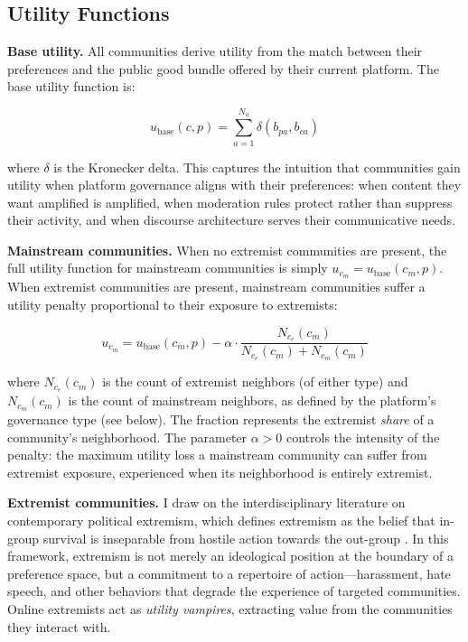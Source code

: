 \documentclass[12pt]{article}
\begin{document}
\subsection{Utility Functions}
\label{sec:utility}

\textbf{Base utility.} All communities derive utility from the match between their preferences and the public good bundle offered by their current platform. The base utility function is:

\begin{equation}
u_{\text{base}}(c, p) = \sum_{a=1}^{N_a} \delta(b_{pa}, b_{ca})
\label{eq:base}
\end{equation}

\noindent where $\delta$ is the Kronecker delta. This captures the intuition that communities gain utility when platform governance aligns with their preferences: when content they want amplified is amplified, when moderation rules protect rather than suppress their activity, and when discourse architecture serves their communicative needs.

\textbf{Mainstream communities.} When no extremist communities are present, the full utility function for mainstream communities is simply $u_{c_m} = u_{\text{base}}(c_m, p)$. When extremist communities are present, mainstream communities suffer a utility penalty proportional to their exposure to extremists:

\begin{equation}
u_{c_m} = u_{\text{base}}(c_m, p) - \alpha \cdot \frac{N_{c_e}(c_m)}{N_{c_e}(c_m) + N_{c_m}(c_m)}
\label{eq:mainstream}
\end{equation}

\noindent where $N_{c_e}(c_m)$ is the count of extremist neighbors (of either type) and $N_{c_m}(c_m)$ is the count of mainstream neighbors, as defined by the platform's governance type (see below). The fraction represents the extremist \textit{share} of a community's neighborhood. The parameter $\alpha > 0$ controls the intensity of the penalty: the maximum utility loss a mainstream community can suffer from extremist exposure, experienced when its neighborhood is entirely extremist.

\textbf{Extremist communities.} I draw on the interdisciplinary literature on contemporary political extremism, which defines extremism as the belief that in-group survival is inseparable from hostile action towards the out-group \citep{berger2018extremism, gaudetteUpvotingExtremismCollective2021}. In this framework, extremism is not merely an ideological position at the boundary of a preference space, but a commitment to a repertoire of action---harassment, hate speech, and other behaviors that degrade the experience of targeted communities. Online extremists act as \textit{utility vampires}, extracting value from the communities they interact with.
\end{document}
